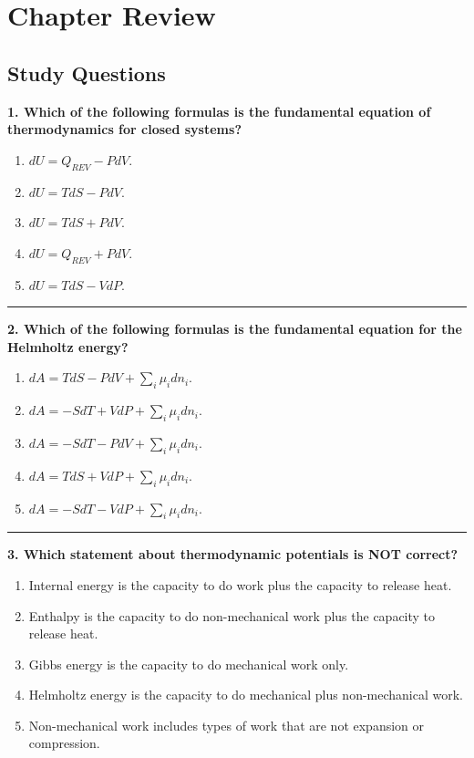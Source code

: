 \documentclass[
  9pt,
]{extbook}
\providecommand{\tightlist}{%
  \setlength{\itemsep}{0pt}\setlength{\parskip}{0pt}}
\theoremstyle{definition}
\theoremstyle{definition}
\theoremstyle{definition}
\theoremstyle{definition}
\theoremstyle{remark}
\begin{document}
\section{Chapter Review}\label{rev8}

\subsection{Study Questions}\label{quest8}

\textbf{1. Which of the following formulas is the fundamental equation of thermodynamics for closed systems?}

\begin{enumerate}
\def\labelenumi{\alph{enumi}.}
\tightlist
\item
  \(dU = Q_{REV} - PdV\).
\item
  \(dU = TdS - PdV\).
\item
  \(dU = TdS + PdV\).
\item
  \(dU = Q_{REV} + PdV\).
\item
  \(dU = TdS - VdP\).
\end{enumerate}

\begin{center}\rule{0.5\linewidth}{0.5pt}\end{center}

\textbf{2. Which of the following formulas is the fundamental equation for the Helmholtz energy?}

\begin{enumerate}
\def\labelenumi{\alph{enumi}.}
\tightlist
\item
  \(dA = TdS - PdV + \sum_i \mu_i dn_i\).
\item
  \(dA = -SdT + VdP + \sum_i \mu_i dn_i\).
\item
  \(dA = -SdT - PdV + \sum_i \mu_i dn_i\).
\item
  \(dA = TdS + VdP + \sum_i \mu_i dn_i\).
\item
  \(dA = -SdT - VdP + \sum_i \mu_i dn_i\).
\end{enumerate}

\begin{center}\rule{0.5\linewidth}{0.5pt}\end{center}

\textbf{3. Which statement about thermodynamic potentials is NOT correct?}

\begin{enumerate}
\def\labelenumi{\alph{enumi}.}
\tightlist
\item
  Internal energy is the capacity to do work plus the capacity to release heat.
\item
  Enthalpy is the capacity to do non-mechanical work plus the capacity to release heat.
\item
  Gibbs energy is the capacity to do mechanical work only.
\item
  Helmholtz energy is the capacity to do mechanical plus non-mechanical work.
\item
  Non-mechanical work includes types of work that are not expansion or compression.
\end{enumerate}
\end{document}
